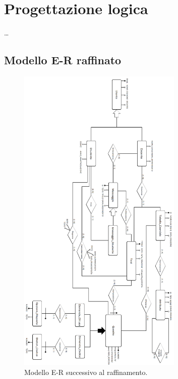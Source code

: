 \documentclass{article}
\begin{document}
\newpage
\section{Progettazione logica}
\large
\dots

\subsection{Modello E-R raffinato}
\large
\begin{figure}[H]
    \includegraphics*[width=0.7\textwidth]{foto1.png}
    \caption{Modello E-R successivo al raffinamento.}
\end{figure}
\end{document}
